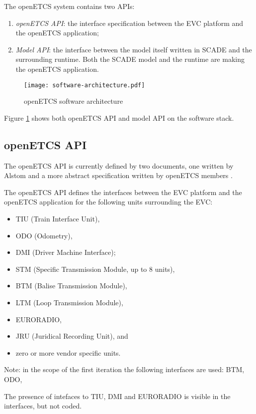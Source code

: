 
The openETCS system contains two APIs:
\begin{enumerate}
\item \emph{openETCS API}: the interface specification between the
EVC platform and the openETCS application;
\item \emph{Model API}: the interface between the model itself written in
SCADE and the surrounding runtime. Both the SCADE model and the
runtime are making the openETCS application.
\end{enumerate}

\begin{figure}[h]
\centering
\texttt{[image: software-architecture.pdf]}
\caption{openETCS software architecture}
\label{fig:software-architecture}
\end{figure}

Figure \ref{fig:software-architecture} shows both openETCS API and
model API on the software stack.

\subsection{openETCS API}

The openETCS API is currently defined by two documents, one written by
Alstom \cite{alstom-api} and a more abstract specification written by
openETCS members \cite{openetcs-api}.

The openETCS API defines the interfaces between the EVC platform and
the openETCS application for the following units surrounding the EVC:
\begin{itemize}
\item TIU (Train Interface Unit),
\item ODO (Odometry),
\item DMI (Driver Machine Interface);
\item STM (Specific Transmission Module, up to 8 units),
\item BTM (Balise Transmission Module),
\item LTM (Loop Transmission Module),
\item EURORADIO,
\item JRU (Juridical Recording Unit), and
\item zero or more vendor specific units.
\end{itemize}
Note: in the scope of the first iteration the following interfaces are used: BTM, ODO, 

The presence of intefaces to TIU, DMI and EURORADIO is visible in the interfaces, but not coded.


